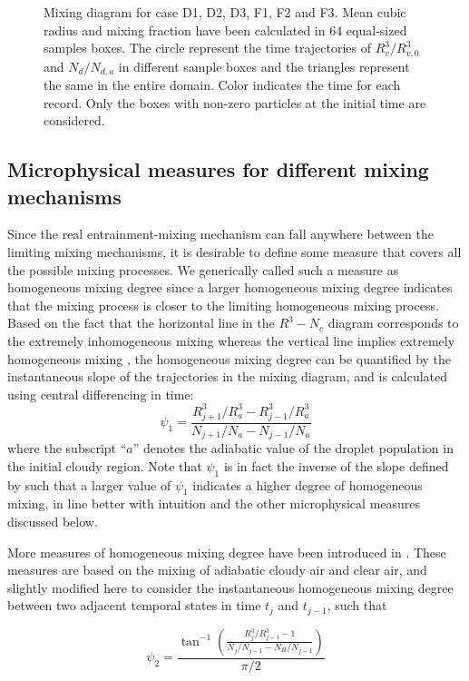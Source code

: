 \documentclass[draft,jgrga]{AGUTeX}
\begin{document}
\begin{article}
\begin{figure}[!htbp]
\caption{Mixing diagram for case D1, D2, D3, F1, F2 and F3. Mean cubic radius
and mixing fraction have been calculated in 64 equal-sized samples boxes. The
circle represent the time trajectories of $R_v^3/R_{v,0}^3$ and $N_d/N_{d,a}$
in different sample boxes and the triangles represent the same in the entire
domain. Color indicates the time for each record. Only the boxes with non-zero
particles at the initial time are considered.}
\label{fig:mixing_diagram}
\end{figure}

\subsection{Microphysical measures for different mixing mechanisms}
Since the real entrainment-mixing mechanism can fall anywhere between the limiting mixing mechanisms, it is desirable to define some measure that covers all the possible mixing processes. We generically called such a measure as homogeneous mixing degree since a larger homogeneous mixing degree indicates that the mixing process is closer to the limiting homogeneous mixing process. Based on the fact that the horizontal line in the $R^3−N_c$ diagram corresponds to the extremely inhomogeneous mixing whereas the vertical line implies extremely homogeneous mixing \citep{And09}, the homogeneous mixing degree can be quantified by the instantaneous slope of the trajectories in the mixing diagram, and is calculated using central differencing in time: 
\begin{equation}
\psi_1 = \frac{R_{j+1}^3/R_a^3 - R_{j-1}^3/R_a^3}{N_{j+1}/N_a - N_{j-1}/N_a}
\label{phi0}
\end{equation}
where the subscript ``$a$'' denotes the adiabatic value of the droplet population in the initial cloudy region. Note that $\psi_1$ is in fact the inverse of the slope defined by \citep{And09} such that a larger value of $\psi_1$ indicates a higher degree of homogeneous mixing, in line better with intuition and the other microphysical measures discussed below.

More measures of homogeneous mixing degree have been introduced in \cite{Lu2011, Lu2014}. 
These measures are based on the mixing of adiabatic cloudy air and clear air, and slightly 
modified here to consider the instantaneous homogeneous mixing degree between two adjacent 
temporal states in time $t_j$ and $t_{j-1}$, such that
  
\begin{equation}
\psi_2 = \frac{\tan^{-1}(\frac{R_{j}^3/R_{j-1}^3 - 1}{N_j/N_{j-1} - N_H/N_{j-1}})}{\pi/2}
\label{phi1}
\end{equation}


\end{article}
\end{document}
